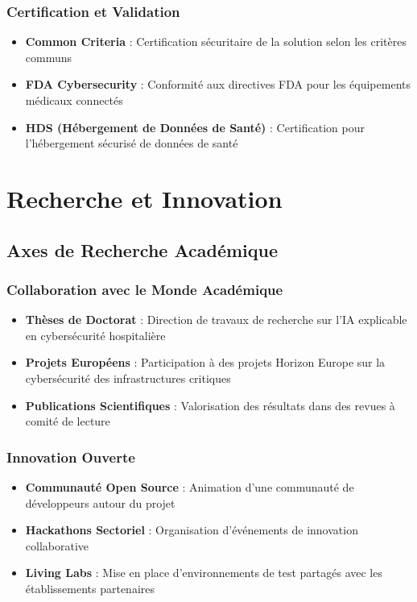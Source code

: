 \subsubsection{Certification et Validation}

\begin{itemize}
    \item \textbf{Common Criteria} : Certification sécuritaire de la solution selon les critères communs
    \item \textbf{FDA Cybersecurity} : Conformité aux directives FDA pour les équipements médicaux connectés
    \item \textbf{HDS (Hébergement de Données de Santé)} : Certification pour l'hébergement sécurisé de données de santé
\end{itemize}

\section{Recherche et Innovation}

\subsection{Axes de Recherche Académique}

\subsubsection{Collaboration avec le Monde Académique}

\begin{itemize}
    \item \textbf{Thèses de Doctorat} : Direction de travaux de recherche sur l'IA explicable en cybersécurité hospitalière
    \item \textbf{Projets Européens} : Participation à des projets Horizon Europe sur la cybersécurité des infrastructures critiques
    \item \textbf{Publications Scientifiques} : Valorisation des résultats dans des revues à comité de lecture
\end{itemize}

\subsubsection{Innovation Ouverte}

\begin{itemize}
    \item \textbf{Communauté Open Source} : Animation d'une communauté de développeurs autour du projet
    \item \textbf{Hackathons Sectoriel} : Organisation d'événements de innovation collaborative
    \item \textbf{Living Labs} : Mise en place d'environnements de test partagés avec les établissements partenaires
\end{itemize}

